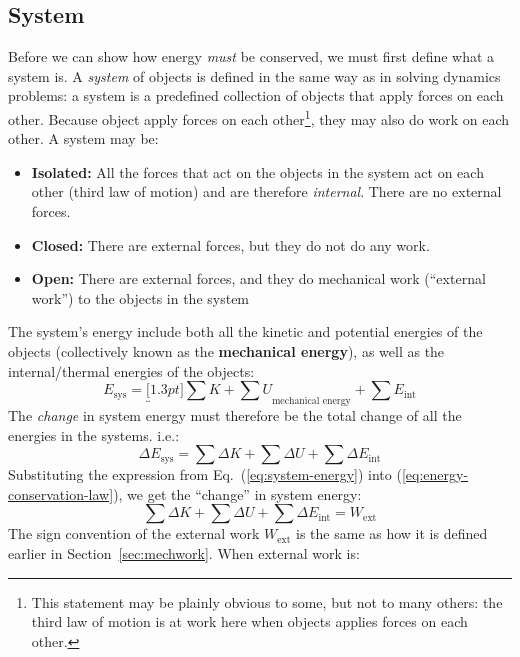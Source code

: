 \subsection{System}

Before we can show how energy \emph{must} be conserved, we must first define
what a system is. A \emph{system} of objects is defined in the same way as in
solving dynamics problems: 
a system is a predefined collection of objects that apply forces on each other.
Because object apply forces on each other\footnote{This statement may be
plainly obvious to some, but not to
many others: the third law of motion is at work here when objects applies
forces on each other.}, they may also do work on each other. A system may be:
\begin{itemize}[leftmargin=12pt,topsep=0pt,itemsep=3pt]
\item\textbf{Isolated:} All the forces that act on the objects in the system
  act on each other (third law of motion) and are therefore \emph{internal}.
  There are no external forces.
\item\textbf{Closed:} There are external forces, but they do not do any work.
\item\textbf{Open:} There are external forces, and they do mechanical work
  (``external work'') to the objects in the system
\end{itemize}

The system's energy include both all the kinetic and potential energies of the
objects (collectively known as the \textbf{mechanical energy}), as well as the
internal/thermal energies of the objects:
\begin{equation}
  \boxed{
    E_\text{sys}
    =\underbracket[1.3pt]{\sum K+\sum U}_\text{mechanical energy}+
    \sum E_\text{int}
  }
  \label{eq:system-energy}
\end{equation}
The \emph{change} in system energy must therefore be the total change of all
the energies in the systems. i.e.:
\begin{equation}
  \boxed{
    \Delta E_\text{sys}
    =\sum\Delta K+\sum\Delta U+\sum\Delta E_\text{int}
  }
  \label{eq:system-energy-change}
\end{equation}
Substituting the expression from Eq.~(\ref{eq:system-energy}) into
(\ref{eq:energy-conservation-law}), we get the ``change'' in system energy:
\begin{equation}
  \boxed{
    \sum\Delta K + \sum\Delta U + \sum\Delta E_\text{int}=W_\text{ext}
  }
\end{equation}
The sign convention of the external work $W_\text{ext}$ is the same as how it
is defined earlier in %
Section~\ref{sec:mechwork}. When external work is:

